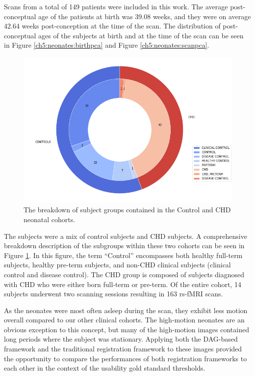 Scans from a total of 149 patients were included in this work. The average post-conceptual age of the patients at birth was 39.08 weeks, and they were on average 42.64 weeks post-conception at the time of the scan. The distribution of post-conceptual ages of the subjects at birth and at the time of the scan can be seen in Figure \ref{ch5:neonates:birthpca} and Figure \ref{ch5:neonates:scanpca}. 

\begin{figure}
\centering
\includegraphics[width=.75\textwidth]{5/demo_neonate_subj_cohort.png}
\caption{The breakdown of subject groups contained in the Control and CHD neonatal cohorts.}
\label{ch5:neonates:cohorts}
\end{figure}

The subjects were a mix of control subjects and CHD subjects. A comprehensive breakdown description of the subgroups within these two cohorts can be seen in Figure \ref{ch5:neonates:cohorts}. In this figure, the term ``Control'' encompasses both healthy full-term subjects, healthy pre-term subjects, and non-CHD clinical subjects (clinical control and disease control). The CHD group is composed of subjects diagnosed with CHD who were either born full-term or pre-term. Of the entire cohort, 14 subjects underwent two scanning sessions resulting in 163 rs-fMRI scans.

As the neonates were most often asleep during the scan, they exhibit less motion overall compared to our other clinical cohorts. The high-motion neonates are an obvious exception to this concept, but many of the high-motion images contained long periods where the subject was stationary. Applying both the DAG-based framework and the traditional registration framework to these images provided the opportunity to compare the performances of both registration frameworks to each other in the context of the usability gold standard thresholds. 

